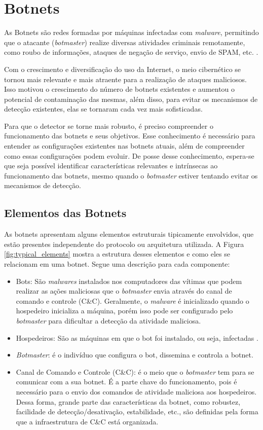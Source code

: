 \chapter{Botnets}
As Botnets são redes formadas por máquinas infectadas com \textit{malware}, permitindo que o atacante (\textit{botmaster}) realize diversas atividades criminais remotamente, como roubo de informações, ataques de negação de serviço, envio de SPAM, etc. \citep{silva2013botnets}.

Com o crescimento e diversificação do uso da Internet, o meio cibernético se tornou mais relevante e mais atraente para a realização de ataques maliciosos. Isso motivou o crescimento do número de botnets existentes e aumentou o potencial de contaminação das mesmas, além disso, para evitar os mecanismos de detecção existentes, elas se tornaram cada vez mais sofisticadas.

Para que o detector se torne mais robusto, é preciso compreender o funcionamento das botnets e seus objetivos. Esse conhecimento é necessário para entender as configurações existentes nas botnets atuais, além de compreender como essas configurações podem evoluir. De posse desse conhecimento, espera-se que seja possível identificar características relevantes e intrínsecas ao funcionamento das botnets, mesmo quando o \textit{botmaster} estiver tentando evitar os mecanismos de detecção.

\section{Elementos das Botnets}
As botnets apresentam alguns elementos estruturais tipicamente envolvidos, que estão presentes independente do protocolo ou arquitetura utilizada. A Figura \ref{fig:typical_elements} mostra a estrutura desses elementos e como eles se relacionam em uma botnet. Segue uma descrição para cada componente:
\begin{itemize}  
\item Bots: São \textit{malwares} instalados nos computadores das vítimas que podem realizar as ações maliciosas que o \textit{botmaster} envia através do canal de comando e controle (C\&C). Geralmente, o \textit{malware} é inicializado quando o hospedeiro inicializa a máquina, porém isso pode ser configurado pelo \textit{botmaster} para dificultar a detecção da atividade maliciosa.
\item Hospedeiros: São as máquinas em que o bot foi instalado, ou seja, infectadas \citep{puri2003bots}.
\item \textit{Botmaster}: é o indivíduo que configura o bot, dissemina e controla a botnet.
\item Canal de Comando e Controle (C\&C): é o meio que o \textit{botmaster} tem para se comunicar com a sua botnet. É a parte chave do funcionamento, pois é necessário para o envio dos comandos de atividade maliciosa aos hospedeiros. Dessa forma, grande parte das características da botnet, como robustez, facilidade de detecção/desativação, estabilidade, etc., são definidas pela forma que a infraestrutura de C\&C está organizada.
\end{itemize}

